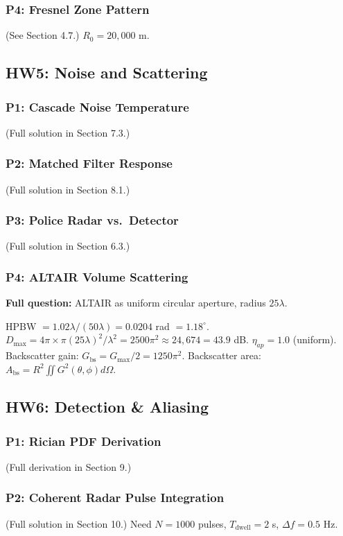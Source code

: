 \documentclass[10pt,letterpaper]{article}
\newcommand{\degrees}{^{\circ}}
\begin{document}
\subsubsection{P4: Fresnel Zone Pattern}
(See Section 4.7.) $R_0 = 20{,}000$ m.

\subsection{HW5: Noise and Scattering}

\subsubsection{P1: Cascade Noise Temperature}
(Full solution in Section 7.3.)

\subsubsection{P2: Matched Filter Response}
(Full solution in Section 8.1.)

\subsubsection{P3: Police Radar vs.\ Detector}
(Full solution in Section 6.3.)

\subsubsection{P4: ALTAIR Volume Scattering}
\textbf{Full question:} ALTAIR as uniform circular aperture, radius $25\lambda$.

HPBW $= 1.02\lambda/(50\lambda) = 0.0204$ rad $= 1.18\degrees$.
$D_\mathrm{max} = 4\pi\times\pi(25\lambda)^2/\lambda^2 = 2500\pi^2 \approx 24{,}674 = 43.9$ dB.
$\eta_{ap} = 1.0$ (uniform).
Backscatter gain: $G_\mathrm{bs} = G_\mathrm{max}/2 = 1250\pi^2$.
Backscatter area: $A_\mathrm{bs} = R^2\iint G^2(\theta,\phi)d\Omega$.

\subsection{HW6: Detection \& Aliasing}

\subsubsection{P1: Rician PDF Derivation}
(Full derivation in Section 9.)

\subsubsection{P2: Coherent Radar Pulse Integration}
(Full solution in Section 10.) Need $N = 1000$ pulses, $T_\mathrm{dwell} = 2$ s, $\Delta f = 0.5$ Hz.
\end{document}
